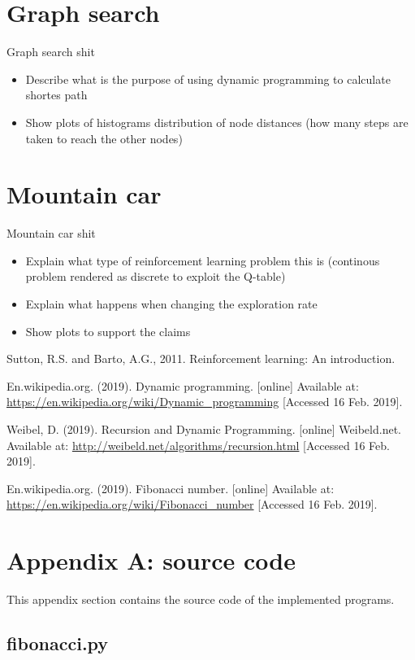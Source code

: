 \documentclass[runningheads]{llncs}
\begin{document}
\section{Graph search}
Graph search shit
\begin{itemize}
\item Describe what is the purpose of using dynamic programming to
  calculate shortes path
\item Show plots of histograms distribution of node distances (how
  many steps are taken to reach the other nodes)
\end{itemize}

\section{Mountain car}
Mountain car shit
\begin{itemize}
\item Explain what type of reinforcement learning problem this is
  (continous problem rendered as discrete to exploit the Q-table)
\item Explain what happens when changing the exploration rate
\item Show plots to support the claims
\end{itemize}


\begin{thebibliography}{8}

Sutton, R.S. and Barto, A.G., 2011. Reinforcement learning: An introduction.

En.wikipedia.org. (2019). Dynamic programming. [online] Available at: \url{https://en.wikipedia.org/wiki/Dynamic\_programming} [Accessed 16 Feb. 2019].

Weibel, D. (2019). Recursion and Dynamic Programming. [online] Weibeld.net. Available at: \url{http://weibeld.net/algorithms/recursion.html} [Accessed 16 Feb. 2019].

En.wikipedia.org. (2019). Fibonacci number. [online] Available at: \url{https://en.wikipedia.org/wiki/Fibonacci\_number} [Accessed 16 Feb. 2019].

\end{thebibliography}


\section{Appendix A: source code}\label{appendix}
This appendix section contains the source code of the implemented programs.

\subsection{fibonacci.py}

\end{document}
